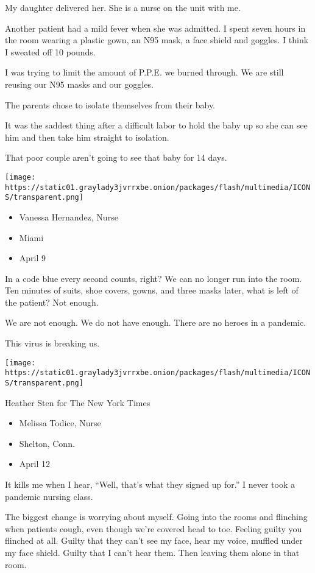 My daughter delivered her. She is a nurse on the unit with me.

Another patient had a mild fever when she was admitted. I spent seven
hours in the room wearing a plastic gown, an N95 mask, a face shield and
goggles. I think I sweated off 10 pounds.

I was trying to limit the amount of P.P.E. we burned through. We are
still reusing our N95 masks and our goggles.

The parents chose to isolate themselves from their baby.

It was the saddest thing after a difficult labor to hold the baby up so
she can see him and then take him straight to isolation.

That poor couple aren't going to see that baby for 14 days.

\texttt{[image: https://static01.graylady3jvrrxbe.onion/packages/flash/multimedia/ICONS/transparent.png]}

\begin{itemize}
\tightlist
\item
  Vanessa Hernandez, Nurse
\item
  Miami
\item
  April 9
\end{itemize}

In a code blue every second counts, right? We can no longer run into the
room. Ten minutes of suits, shoe covers, gowns, and three masks later,
what is left of the patient? Not enough.

We are not enough. We do not have enough. There are no heroes in a
pandemic.

This virus is breaking us.

\texttt{[image: https://static01.graylady3jvrrxbe.onion/packages/flash/multimedia/ICONS/transparent.png]}

Heather Sten for The New York Times

\begin{itemize}
\tightlist
\item
  Melissa Todice, Nurse
\item
  Shelton, Conn.
\item
  April 12
\end{itemize}

It kills me when I hear, ``Well, that's what they signed up for.'' I
never took a pandemic nursing class.

The biggest change is worrying about myself. Going into the rooms and
flinching when patients cough, even though we're covered head to toe.
Feeling guilty you flinched at all. Guilty that they can't see my face,
hear my voice, muffled under my face shield. Guilty that I can't hear
them. Then leaving them alone in that room.

